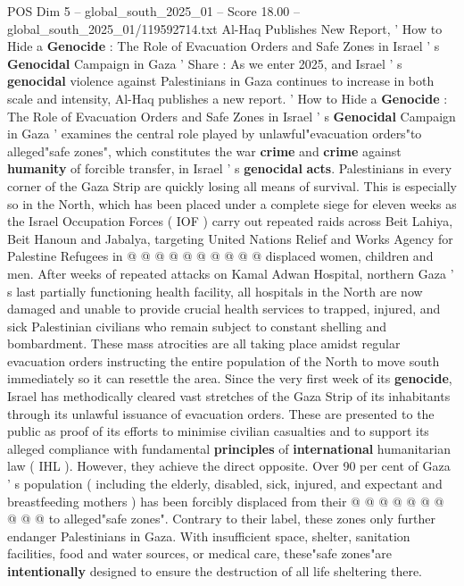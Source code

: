 \begin{textsample}{POS Dim 5 – global\_south\_2025\_01 – Score 18.00 – global\_south\_2025\_01/119592714.txt}  \label{ex:f5_pos_292}
Al-Haq Publishes New Report, ' How to Hide a \textbf{Genocide} : The Role of Evacuation Orders and Safe Zones in Israel ' s \textbf{Genocidal} Campaign in Gaza ' Share : As we enter 2025, and Israel ' s \textbf{genocidal} violence against Palestinians in Gaza continues to increase in both scale and intensity, Al-Haq publishes a new report. ' How to Hide a \textbf{Genocide} : The Role of Evacuation Orders and Safe Zones in Israel ' s \textbf{Genocidal} Campaign in Gaza ' examines the central role played by unlawful"evacuation orders"to alleged"safe zones", which constitutes the war \textbf{crime} and \textbf{crime} against \textbf{humanity} of forcible transfer, in Israel ' s \textbf{genocidal} \textbf{acts}.
Palestinians in every corner of the Gaza Strip are quickly losing all means of survival.
This is especially so in the North, which has been placed under a complete siege for eleven weeks as the Israel Occupation Forces ( IOF ) carry out repeated raids across Beit Lahiya, Beit Hanoun and Jabalya, targeting United Nations Relief and Works Agency for Palestine Refugees in @ @ @ @ @ @ @ @ @ @ displaced women, children and men.
After weeks of repeated attacks on Kamal Adwan Hospital, northern Gaza ' s last partially functioning health facility, all hospitals in the North are now damaged and unable to provide crucial health services to trapped, injured, and sick Palestinian civilians who remain subject to constant shelling and bombardment.
These mass atrocities are all taking place amidst regular evacuation orders instructing the entire population of the North to move south immediately so it can resettle the area.
Since the very first week of its \textbf{genocide}, Israel has methodically cleared vast stretches of the Gaza Strip of its inhabitants through its unlawful issuance of evacuation orders.
These are presented to the public as proof of its efforts to minimise civilian casualties and to support its alleged compliance with fundamental \textbf{principles} of \textbf{international} humanitarian law ( IHL ).
However, they achieve the direct opposite.
Over 90 per cent of Gaza ' s population ( including the elderly, disabled, sick, injured, and expectant and breastfeeding mothers ) has been forcibly displaced from their @ @ @ @ @ @ @ @ @ @ to alleged"safe zones".
Contrary to their label, these zones only further endanger Palestinians in Gaza.
With insufficient space, shelter, sanitation facilities, food and water sources, or medical care, these"safe zones"are \textbf{intentionally} designed to ensure the destruction of all life sheltering there.

\end{textsample}
